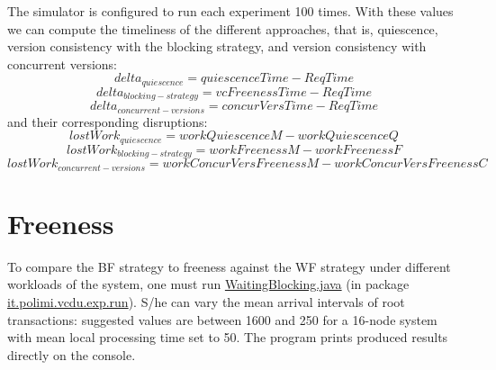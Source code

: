 \documentclass[a4paper,10pt]{article}
\begin{document}
The simulator is configured to run each experiment 100 times. With these values we can compute the timeliness of the different approaches, that is, quiescence, version consistency with the blocking strategy, and version consistency with concurrent versions:
\begin{equation}
       delta_{quiescence} = quiescenceTime - ReqTime
\end{equation}
\begin{equation}
       delta_{blocking-strategy} = vcFreenessTime - ReqTime
\end{equation}
\begin{equation}
       delta_{concurrent-versions} = concurVersTime - ReqTime
\end{equation}
and their corresponding disruptions:
\begin{equation}
lostWork_{quiescence} = workQuiescenceM - workQuiescenceQ 
\end{equation}
\begin{equation}
lostWork_{blocking-strategy} = workFreenessM - workFreenessF
\end{equation}
\begin{equation}
lostWork_{concurrent-versions} = workConcurVersFreenessM - workConcurVersFreenessC
\end{equation}

\section{Freeness}

To compare the BF strategy to freeness against the WF strategy under different workloads of the system, one must run
\url{WaitingBlocking.java} (in package \url{it.polimi.vcdu.exp.run}). S/he can vary the mean arrival intervals of root
transactions: suggested values are between 1600 and 250 for a 16-node system with mean local processing time set to 50. The
program prints produced results directly on the console.
\end{document}
